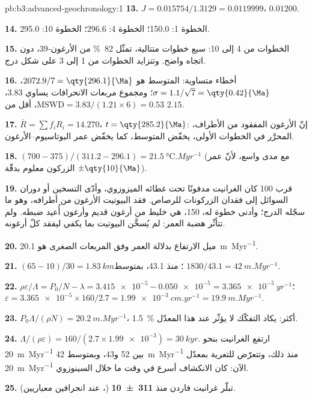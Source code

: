 \begin{solution}{pb:b3:advanced-geochronology:1}
\textbf{13.} $J = 0.015754/1.3129 = 0.0119999$، $0.01200$.

\textbf{14.} الخطوة 1: \qty{150.0}{\Ma}؛ الخطوة 4: \qty{296.6}{\Ma}؛ الخطوة 10:
\qty{295.0}{\Ma}.

\textbf{15.} الخطوات من 4 إلى 10: سبع خطوات متتالية، تمثّل \qty{82}{\percent} من الأرغون-39،
دون اتجاه واضح. وتتزايد الخطوات من 1 إلى 3 على شكل درج.

\textbf{16.} أخطاء متساوية: المتوسط هو $2072.9/7 = \qty{296.1}{\Ma}$، $\sigma =
1.1/\sqrt7 = \qty{0.42}{\Ma}$؛ ومجموع مربعات الانحرافات يساوي $3.83$،
$\mathrm{MSWD} = 3.83/(1.21\times6) = 0.53$، أقل من $2.15$.

\textbf{17.} $\bar R = \sum f_iR_i = 14.270$، $t = \qty{285.2}{\Ma}$: إنّ
الأرغون المفقود من الأطراف، المحرَّر في الخطوات الأولى، يخفّض المتوسط،
كما يخفّض عمر البوتاسيوم--الأرغون.

\textbf{18.} $(700 - 375)/(311.2 - 296.1) = \qty{21.5}{\celsius.Myr^{-1}}$
(مع مدى واسع، لأنّ عمر الزركون معلوم بدقّة $\pm\qty{10}{\Ma}$).

\textbf{19.} قرب \qty{100}{\Ma} كان الغرانيت مدفونًا تحت
غطائه الميزوزوي، وأدّى التسخين أو دوران السوائل إلى فقدان الزركونات للرصاص.
فقد البيوتيت الأرغون من أطرافه، وهو ما سجّله الدرج؛ وأدنى
خطوة له، \qty{150}{\Ma}، هي خليط من أرغون قديم وأرغون أُعيد ضبطه. ولم تتأثّر
هضبة العمر: لم يُسخَّن البيوتيت بما يكفي ليفقد كلّ أرغونه.

\textbf{20.} ميل الارتفاع بدلالة العمر وفق المربعات الصغرى هو
\qty{20.1}{m.Myr^{-1}}.

\textbf{21.} $(65 - 10)/30 = \qty{1.83}{km}$؛ منذ \qty{43.1}{\Ma}، بمتوسط
$1830/43.1 = \qty{42}{m.Myr^{-1}}$.

\textbf{22.} $\rho\varepsilon/\Lambda = P_0/N - \lambda = \num{3.415e-5} -
\num{0.050e-5} = \qty{3.365e-5}{yr^{-1}}$؛ $\varepsilon = \num{3.365e-5}\times
160/2.7 = \qty{1.99e-3}{cm.yr^{-1}} = \qty{19.9}{m.Myr^{-1}}$.

\textbf{23.} $P_0\Lambda/(\rho N) = \qty{20.2}{m.Myr^{-1}}$، \qty{1.5}{\percent}
أكثر: يكاد التفكّك لا يؤثّر عند هذا المعدّل.

\textbf{24.} $\Lambda/(\rho\varepsilon) = 160/(2.7\times\num{1.99e-3}) =
\qty{30}{kyr}$. ارتفع الغرانيت بنحو \qty{20}{m.Myr^{-1}} بين 52
و\qty{43}{\Ma}، وبمتوسط \qty{42}{m.Myr^{-1}} منذ ذلك، وتتعرّض للتعرية بمعدّل
\qty{20}{m.Myr^{-1}} الآن: كان الانكشاف أسرع في وقت ما
خلال السينوزوي.

\textbf{25.} تبلّر غرانيت فاردن منذ
\textbf{\qty[text-series-to-math=true, separate-uncertainty=true]{311 \pm 10}{\Ma}} (،
عند انحرافين معياريين).
\end{solution}
